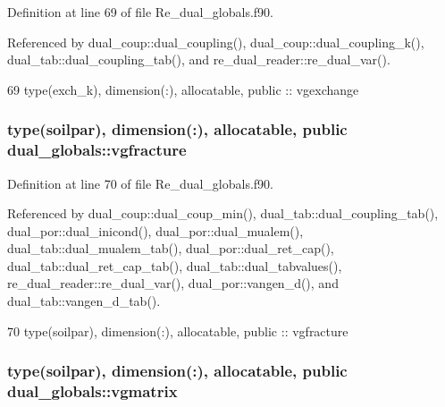 Definition at line 69 of file Re\+\_\+dual\+\_\+globals.\+f90.



Referenced by dual\+\_\+coup\+::dual\+\_\+coupling(), dual\+\_\+coup\+::dual\+\_\+coupling\+\_\+k(), dual\+\_\+tab\+::dual\+\_\+coupling\+\_\+tab(), and re\+\_\+dual\+\_\+reader\+::re\+\_\+dual\+\_\+var().


\begin{DoxyCode}
69   \textcolor{keywordtype}{type}(exch_k), \textcolor{keywordtype}{dimension(:)}, \textcolor{keywordtype}{allocatable}, \textcolor{keywordtype}{public} :: vgexchange
\end{DoxyCode}
\subsubsection[{vgfracture}]{\setlength{\rightskip}{0pt plus 5cm}type({\bf soilpar}), dimension(\+:), allocatable, public dual\+\_\+globals\+::vgfracture}\label{namespacedual__globals_a4e09add4a27badb061002e921c28cff0}


Definition at line 70 of file Re\+\_\+dual\+\_\+globals.\+f90.



Referenced by dual\+\_\+coup\+::dual\+\_\+coup\+\_\+min(), dual\+\_\+tab\+::dual\+\_\+coupling\+\_\+tab(), dual\+\_\+por\+::dual\+\_\+inicond(), dual\+\_\+por\+::dual\+\_\+mualem(), dual\+\_\+tab\+::dual\+\_\+mualem\+\_\+tab(), dual\+\_\+por\+::dual\+\_\+ret\+\_\+cap(), dual\+\_\+tab\+::dual\+\_\+ret\+\_\+cap\+\_\+tab(), dual\+\_\+tab\+::dual\+\_\+tabvalues(), re\+\_\+dual\+\_\+reader\+::re\+\_\+dual\+\_\+var(), dual\+\_\+por\+::vangen\+\_\+d(), and dual\+\_\+tab\+::vangen\+\_\+d\+\_\+tab().


\begin{DoxyCode}
70   \textcolor{keywordtype}{type}(soilpar), \textcolor{keywordtype}{dimension(:)}, \textcolor{keywordtype}{allocatable}, \textcolor{keywordtype}{public} :: vgfracture
\end{DoxyCode}
\subsubsection[{vgmatrix}]{\setlength{\rightskip}{0pt plus 5cm}type({\bf soilpar}), dimension(\+:), allocatable, public dual\+\_\+globals\+::vgmatrix}\label{namespacedual__globals_a2bc790692a595654839b3e2c01d5b39d}



